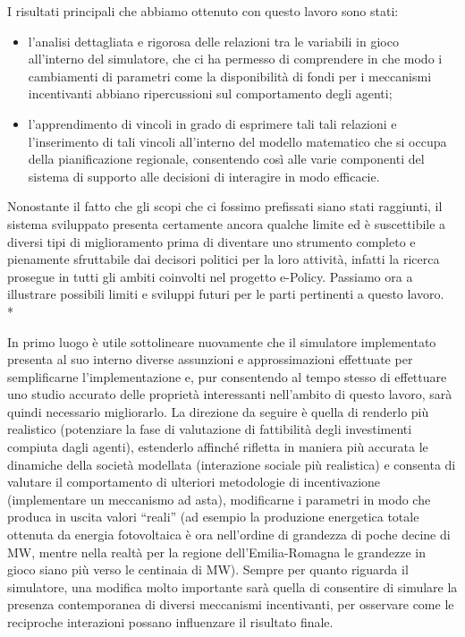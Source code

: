 I risultati principali che abbiamo ottenuto con questo lavoro sono stati: 
\begin{itemize}
\item l'analisi dettagliata e rigorosa delle relazioni tra le variabili in gioco all'interno del simulatore, che ci ha permesso di comprendere in che modo i cambiamenti di parametri come la disponibilità di fondi per i meccanismi incentivanti abbiano ripercussioni sul comportamento degli agenti;
\item l'apprendimento di vincoli in grado di esprimere tali tali relazioni e l'inserimento di tali vincoli all'interno del modello matematico che si occupa della pianificazione regionale, consentendo così alle varie componenti del sistema di supporto alle decisioni di interagire in modo efficacie.
\end{itemize}

Nonostante il fatto che gli scopi che ci fossimo prefissati siano stati raggiunti, il sistema sviluppato presenta certamente ancora qualche limite ed è suscettibile a diversi tipi di miglioramento prima di diventare uno strumento completo e pienamente sfruttabile dai decisori politici per la loro attività, infatti la ricerca prosegue in tutti gli ambiti coinvolti nel progetto e-Policy. Passiamo ora a illustrare possibili limiti e sviluppi futuri per le parti pertinenti a questo lavoro.
\\*

In primo luogo è utile sottolineare nuovamente che il simulatore implementato presenta al suo interno diverse assunzioni e approssimazioni effettuate per semplificarne l'implementazione e, pur consentendo al tempo stesso di effettuare uno studio accurato delle proprietà interessanti nell'ambito di questo lavoro, sarà quindi necessario migliorarlo. La direzione da seguire è quella di renderlo più realistico (potenziare la fase di valutazione di fattibilità degli investimenti compiuta dagli agenti), estenderlo affinché rifletta in maniera più accurata le dinamiche della società modellata (interazione sociale più realistica) e consenta di valutare il comportamento di ulteriori metodologie di incentivazione (implementare un meccanismo ad asta), modificarne i parametri in modo che produca in uscita valori ``reali'' (ad esempio la produzione energetica totale ottenuta da energia fotovoltaica è ora nell'ordine di grandezza di poche decine di MW, mentre nella realtà per la regione dell'Emilia-Romagna le grandezze in gioco siano più verso le centinaia di MW). Sempre per quanto riguarda il simulatore, una modifica molto importante sarà quella di consentire di simulare la presenza contemporanea di diversi meccanismi incentivanti, per osservare come le reciproche interazioni possano influenzare il risultato finale.

